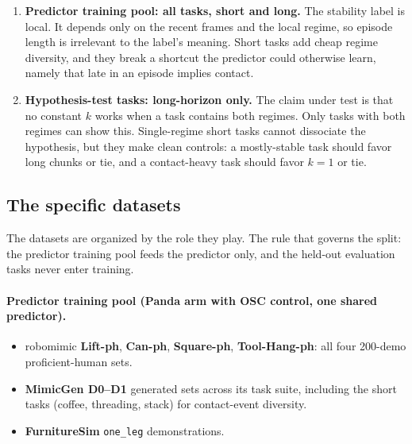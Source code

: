\documentclass[11pt]{article}
\begin{document}
\begin{enumerate}[leftmargin=2em]
  \item \textbf{Predictor training pool: all tasks, short and long.} The stability label
        is local. It depends only on the recent frames and the local regime, so episode
        length is irrelevant to the label's meaning. Short tasks add cheap regime
        diversity, and they break a shortcut the predictor could otherwise learn, namely
        that late in an episode implies contact.
  \item \textbf{Hypothesis-test tasks: long-horizon only.} The claim under test is that
        no constant $k$ works when a task contains both regimes. Only tasks with both
        regimes can show this. Single-regime short tasks cannot dissociate the
        hypothesis, but they make clean controls: a mostly-stable task should favor long
        chunks or tie, and a contact-heavy task should favor $k=1$ or tie.
\end{enumerate}

\subsection{The specific datasets}

The datasets are organized by the role they play. The rule that governs the split:
the predictor training pool feeds the predictor only, and the held-out evaluation
tasks never enter training.

\paragraph{Predictor training pool (Panda arm with OSC control, one shared predictor).}
\begin{itemize}[leftmargin=2em]
  \item robomimic \textbf{Lift-ph}, \textbf{Can-ph}, \textbf{Square-ph},
        \textbf{Tool-Hang-ph}: all four 200-demo proficient-human sets.
  \item \textbf{MimicGen D0--D1} generated sets across its task suite, including the
        short tasks (coffee, threading, stack) for contact-event diversity.
  \item \textbf{FurnitureSim} \texttt{one\_leg} demonstrations.
\end{itemize}
\end{document}

